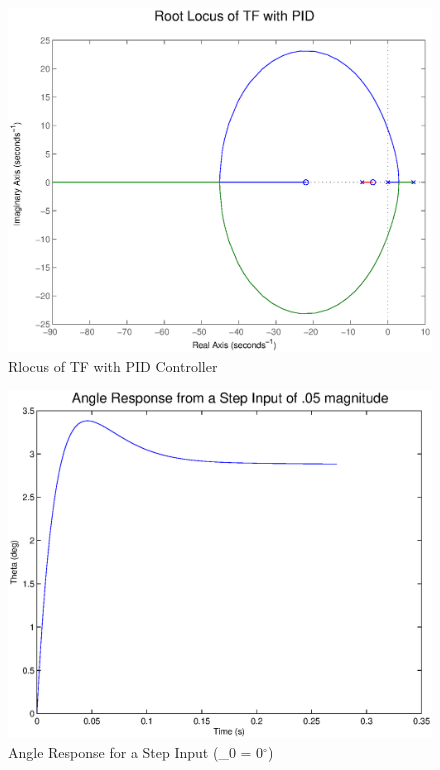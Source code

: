 \documentclass{article}
\begin{document}
\begin{figure}[!htb]
    \centering
    \includegraphics[scale=0.6]{1}
    \caption{ Rlocus of TF with PID Controller}
\end{figure} 

\begin{figure}[!htb]
    \centering
    \includegraphics[scale=0.6]{2}
    \caption{Angle Response for a Step Input (\theta_0 = 0$^{\circ}$)}
\end{figure} 
\end{document}
